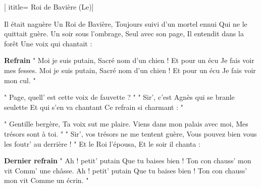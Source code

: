 [
ititle= {Roi de Bavière (Le)}]


\beginverse
Il était naguère
Un Roi de Bavière,
Toujours suivi d'un mortel ennui
Qui ne le quittait guère.
Un soir sous l'ombrage,
Seul avec son page,
Il entendit dans la forêt
Une voix qui chantait :
\endverse

\beginchorus
\textbf {Refrain}
" Moi je suis putain,
Sacré nom d'un chien !
Et pour un écu
Je fais voir mes fesses.
Moi je suis putain,
Sacré nom d'un chien !
Et pour un écu
Je fais voir mon cul. "
\endchorus

\beginverse
" Page, quell' est cette voix de fauvette ? "
" Sir', c'est Agnès qui se branle seulette
Et qui s'en va chantant
Ce refrain si charmant : "
\endverse

\beginverse
" Gentille bergère,
Ta voix sut me plaire.
Viens dans mon palais avec moi,
Mes trésors sont à toi. "
" Sir', vos trésors ne me tentent guère,
Vous pouvez bien vous les foutr' au derrière ! "
Et le Roi l'épousa,
Et le soir il chanta :
\endverse

\beginchorus
\textbf {Dernier refrain}
" Ah ! petit' putain
Que tu baises bien !
Ton con chauss' mon vit
Comm' une châsse.
Ah ! petit' putain
Que tu baises bien !
Ton con chauss' mon vit
Comme un écrin. "
\endchorus

\endsong
